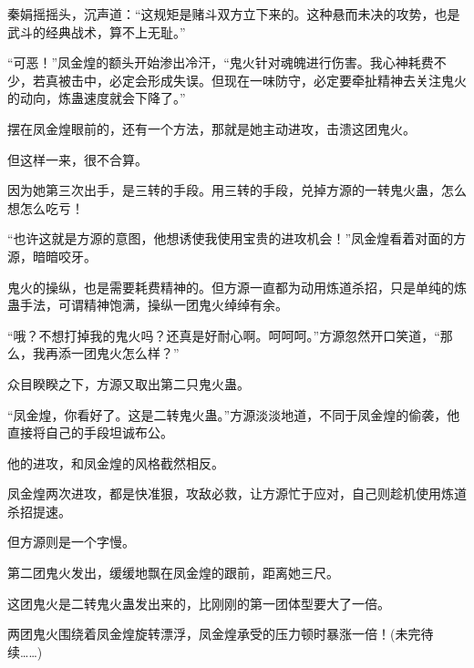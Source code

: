 \begin{this_body}
秦娟摇摇头，沉声道：“这规矩是赌斗双方立下来的。这种悬而未决的攻势，也是武斗的经典战术，算不上无耻。”

“可恶！”凤金煌的额头开始渗出冷汗，“鬼火针对魂魄进行伤害。我心神耗费不少，若真被击中，必定会形成失误。但现在一味防守，必定要牵扯精神去关注鬼火的动向，炼蛊速度就会下降了。”

摆在凤金煌眼前的，还有一个方法，那就是她主动进攻，击溃这团鬼火。

但这样一来，很不合算。

因为她第三次出手，是三转的手段。用三转的手段，兑掉方源的一转鬼火蛊，怎么想怎么吃亏！

“也许这就是方源的意图，他想诱使我使用宝贵的进攻机会！”凤金煌看着对面的方源，暗暗咬牙。

鬼火的操纵，也是需要耗费精神的。但方源一直都为动用炼道杀招，只是单纯的炼蛊手法，可谓精神饱满，操纵一团鬼火绰绰有余。

“哦？不想打掉我的鬼火吗？还真是好耐心啊。呵呵呵。”方源忽然开口笑道，“那么，我再添一团鬼火怎么样？”

众目睽睽之下，方源又取出第二只鬼火蛊。

“凤金煌，你看好了。这是二转鬼火蛊。”方源淡淡地道，不同于凤金煌的偷袭，他直接将自己的手段坦诚布公。

他的进攻，和凤金煌的风格截然相反。

凤金煌两次进攻，都是快准狠，攻敌必救，让方源忙于应对，自己则趁机使用炼道杀招提速。

但方源则是一个字慢。

第二团鬼火发出，缓缓地飘在凤金煌的跟前，距离她三尺。

这团鬼火是二转鬼火蛊发出来的，比刚刚的第一团体型要大了一倍。

两团鬼火围绕着凤金煌旋转漂浮，凤金煌承受的压力顿时暴涨一倍！(未完待续……)

\end{this_body}

